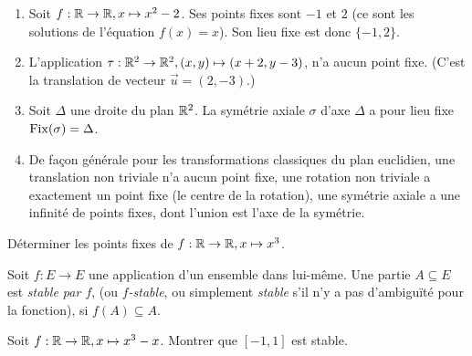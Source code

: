 \begin{exemple}
\begin{enumerate}
\item Soit $f : \mathbb{R}\to \mathbb{R}, x\mapsto x^2-2$. Ses points fixes sont $-1$ et $2$ (ce sont les solutions de l'équation $f(x)=x$). Son lieu fixe est donc $\{-1,2\}$.
\item L'application $\tau : \mathbb{R}^2\to \mathbb{R}^2, (x,y) \mapsto (x+2,y-3)$, n'a aucun point fixe. (C'est la translation de vecteur $\vec u = (2,-3)$.)
\item Soit $\Delta$ une droite du plan $\mathbb{R}^2$. La symétrie axiale $\sigma$ d'axe $\Delta$ a pour lieu fixe $\operatorname{Fix}(\sigma)=\Delta$.
\item De façon générale pour les transformations classiques du plan euclidien, une translation non triviale n'a aucun point fixe, une rotation non triviale a exactement un point fixe (le centre de la rotation), une symétrie axiale a une infinité de points fixes, dont l'union est l'axe de la symétrie.
\end{enumerate}
\end{exemple}

\begin{exercice}
Déterminer les points fixes de $f : \mathbb{R}\to \mathbb{R}, x\mapsto x^3$.
\end{exercice}

\begin{definition}
Soit $f : E\to E$ une application d'un ensemble dans lui-même. Une partie $A\subseteq E$ est \emph{stable par $f$}, (ou \emph{$f$-stable}, ou simplement \emph{stable} s'il n'y a pas d'ambiguïté pour la fonction), si $f(A)\subseteq A$.
\end{definition}

\begin{exercice}
Soit $f : \mathbb{R}\to \mathbb{R}, x\mapsto x^3-x$. Montrer que $[-1,1]$ est stable.
\end{exercice}

